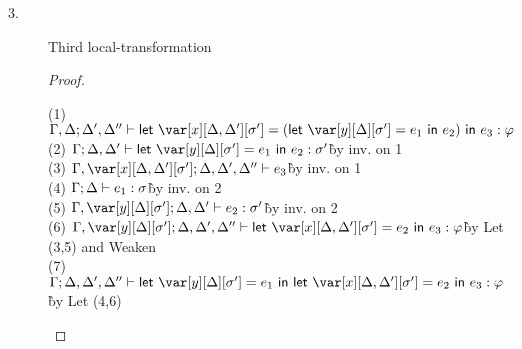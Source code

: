 \begin{description}
\item[3.] Third local-transformation
\begin{proof}~
\begin{tabbing}
    (1) $\G, \D;\D',\D'' \vdash \llet{\x[\D,\D'][\s'] = (\llet{\yD = e_1}{e_2})}{e_3} : \vp$\\
    (2) $\G; \D, \D' \vdash \llet{\yD = e_1}{e_2} : \s'$\`by inv. on 1\\
    (3) $\G, \x[\D,\D'][\s'];\D,\D',\D'' \vdash e_3$\`by inv. on 1\\
    (4) $\Gamma; \Delta \vdash e_1 : \sigma$\`by inv. on 2\\
    (5) $\G, \yD; \D,\D' \vdash e_2 : \s'$\`by inv. on 2\\
    (6) $\G, \yD; \D,\D',\D'' \vdash \llet{\x[\D,\D'][\s'] = e_2}{e_3} : \vp$\`by Let (3,5) and Weaken\\
    (7) $\G; \D,\D',\D'' \vdash \llet{\yD = e_1}{\llet{\x[\D,\D'][\s'] = e_2}{e_3}} : \vp$\`by Let (4,6)\\
\end{tabbing}
\end{proof}
\end{description}




